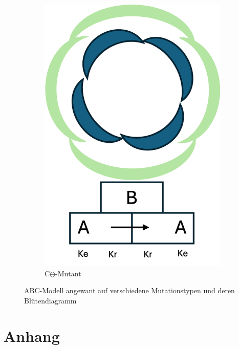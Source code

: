 \documentclass[10pt,a4paper]{article}
\begin{document}
\begin{figure}[H]
\begin{subfigure}[b]{0.3\textwidth}
				\includegraphics[width=\textwidth]{C-Mutant_diagramm.png}
				\caption{C$\ominus$-Mutant}
				\label{fig:C-Mutant}
			\end{subfigure}
	
			\caption{ABC-Modell angewant auf verschiedene Mutationstypen und deren Blütendiagramm}
			\label{blütendiagramm mutation}
		\end{figure}
		
		

	\section{Anhang}

	
	\nocite{*}
	
	\newpage

	
\end{document}
